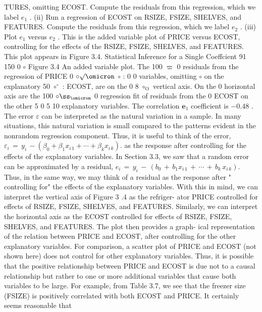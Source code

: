 \documentclass[11pt]{article}
\begin{document}
TURES, omitting ECOST. Compute the residuals from this regression,
 which we label \(e_{1}\) .
(ii) Run a regression of ECOST on RSIZE, FSIZE, SHELVES, and
FEATURES. Compute the residuals from this regression, which we
label \(e_{2}\) .
(iii) Plot \(e_{1}\) versus \(e_{2}\) . This is the added variable plot of PRICE versus
ECOST, controlling for the effects of the RSIZE, FSIZE, SHELVES, and
 FEATURES. This plot appears in Figure 3.4.
 Statistical Inference for a Single Coeffcient 91
150 0 \(\circ\) Figure 3.4 An added
variable plot. The
100 \(\varpi\) 0 residuals from the
regression of PRICE
0 \(\circ\surd\omicron\) \(\circ\) : 0 0 variables, omitting
\(\circ\) on the explanatory
50 \(\circ^{\circ}\) : ECOST, are on the
0 8 \(\circ_{\mathrm{O}}\) vertical axis. On the
0 horizontal axis are the
100 \(\circ\ss_{\omicron}\) 0 regression fit of
residuals from the
0 ECOST on the other
5 \(0\) 5 10 explanatory variables.
The correlation
\(\mathbf{e}_{1}\) coefficient is \(- 0 . 4 8\) .
The error \(\varepsilon\) can be interpreted as the natural variation in a sample. In many
situations, this natural variation is small compared to the patterns evident in
the nonrandom regression component. Thus, it is useful to think of the error,
\(\varepsilon_{i} \,=\, y_{i} \,-( \beta_{0}+\beta_{1} x_{i \, 1}+\cdots+\beta_{k} x_{i \, k} ) .\) as the response after controlling for the
effects of the explanatory variables. In Section 3.3, we saw that a random error
can be approximated by a residual, \(e_{i} \,=\, y_{i} \,-\, ( b_{0} \,+\, b_{1} x_{i \, 1} \,+\, \cdots\,+\, b_{k} \, x_{i \, k} ) .\) Thus,
 in the same way, we may think of a residual as the response after " controlling
for" the effects of the explanatory variables.
 With this in mind, we can interpret the vertical axis of Figure 3 .4 as the refriger-
 ator PRICE controlled for effects of RSIZE, FSIZE, SHELVES, and FEATURES.
 Similarly, we can interpret the horizontal axis as the ECOST controlled for effects
 of RSIZE, FSIZE, SHELVES, and FEATURES. The plot then provides a graph-
 ical representation of the relation between PRICE and ECOST, after controlling
for the other explanatory variables. For comparison, a scatter plot of PRICE and
 ECOST (not shown here) does not control for other explanatory variables. Thus,
 it is possible that the positive relationship between PRICE and ECOST is due not
 to a causal relationship but rather to one or more additional variables that cause
 both variables to be large.
For example, from Table 3.7, we see that the freezer size (FSIZE) is positively
correlated with both ECOST and PRICE. It certainly seems reasonable that
\end{document}
